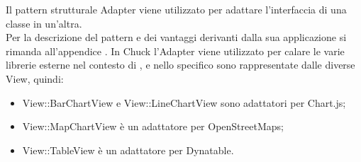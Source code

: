 	Il pattern strutturale Adapter viene utilizzato per adattare l'interfaccia di una classe in un'altra.\\
	Per la descrizione del pattern e dei vantaggi derivanti dalla sua applicazione si rimanda all'appendice .
	In Chuck l'Adapter viene utilizzato per calare le varie librerie esterne nel contesto di \projectname{}, e nello specifico sono rappresentate dalle diverse View, quindi:
	\begin{itemize}
	\item View::BarChartView e View::LineChartView sono adattatori per Chart.js;
	\item View::MapChartView è un adattatore per OpenStreetMaps;
	\item View::TableView è un adattatore per Dynatable.
	\end{itemize}
	
		
		
		
	
